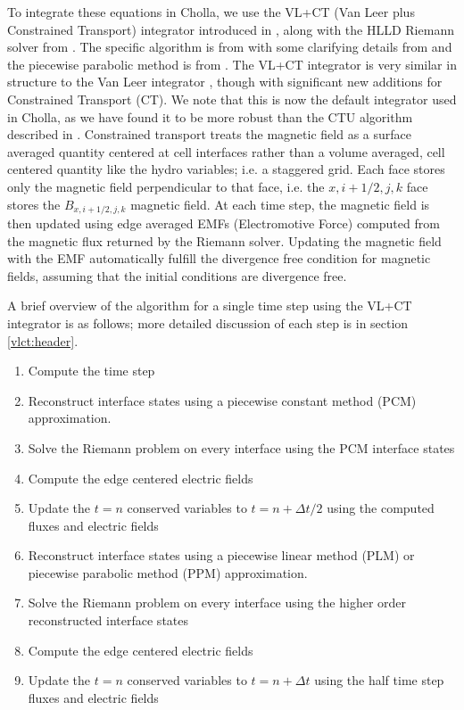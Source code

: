 To integrate these equations in Cholla, we use the VL+CT (Van Leer plus Constrained Transport) integrator introduced in \cite{stone_2009}, along with the HLLD Riemann solver from \cite{hlld_2005}. The specific algorithm is from \cite{stone_2009} with some clarifying details from \cite{gardiner_2005,gardiner_unsplit_2008,stone_athena_2008} and the piecewise parabolic method is from \cite{felker_2020}. The VL+CT integrator is very similar in structure to the Van Leer integrator \citep{van_leer_2003, falle_1991, Toro}, though with significant new additions for Constrained Transport (CT). We note that this is now the default integrator used in Cholla, as we have found it to be more robust than the CTU algorithm described in \cite{schneider_2015}. Constrained transport treats the magnetic field as a surface averaged quantity centered at cell interfaces rather than a volume averaged, cell centered quantity like the hydro variables; i.e. a staggered grid. Each face stores only the magnetic field perpendicular to that face, i.e. the $x,i+1/2,j,k$ face stores the $B_{x,i+1/2,j,k}$ magnetic field. At each time step, the magnetic field is then updated using edge averaged EMFs (Electromotive Force) computed from the magnetic flux returned by the Riemann solver. Updating the magnetic field with the EMF automatically fulfill the divergence free condition for magnetic fields, assuming that the initial conditions are divergence free.

A brief overview of the algorithm for a single time step using the VL+CT integrator is as follows; more detailed discussion of each step is in section \ref{vlct:header}.

\begin{enumerate}
    \item Compute the time step
    \item Reconstruct interface states using a piecewise constant method (PCM) approximation.
    \item Solve the Riemann problem on every interface using the PCM interface states
    \item Compute the edge centered electric fields
    \item Update the $t=n$ conserved variables to $t=n+\Delta t/2$ using the computed fluxes and electric fields
    \item Reconstruct interface states using a piecewise linear method (PLM) or piecewise parabolic method (PPM) approximation.
    \item Solve the Riemann problem on every interface using the higher order reconstructed interface states
    \item Compute the edge centered electric fields
    \item Update the $t=n$ conserved variables to $t=n+\Delta t$ using the half time step fluxes and electric fields
\end{enumerate}


